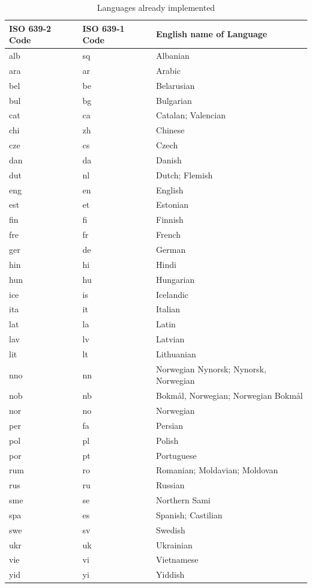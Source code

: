 \begin{table}[!htp]
    \caption{Languages already implemented}
    \label{tab:languagesImplemented}
    \begin{tabular}{L{3cm}|L{3cm}|L{6.5cm}}
      \textbf{ISO 639-2 Code} & \textbf{ISO 639-1 Code} & \textbf{English name of Language}\\
      \hline
alb & sq & Albanian\\
ara & ar & Arabic\\
bel & be & Belarusian\\
bul & bg & Bulgarian\\
cat & ca & Catalan; Valencian\\
chi & zh & Chinese\\
cze & cs & Czech\\
dan & da & Danish\\
dut & nl & Dutch; Flemish\\
eng & en & English\\
est & et & Estonian\\
fin & fi & Finnish\\
fre & fr & French\\
ger & de & German\\
hin & hi & Hindi\\
hun & hu & Hungarian\\
ice & is & Icelandic\\
ita & it & Italian\\
lat & la & Latin\\
lav & lv & Latvian\\
lit & lt & Lithuanian\\
nno & nn & Norwegian Nynorsk; Nynorsk, Norwegian\\
nob & nb & Bokmål, Norwegian; Norwegian Bokmål\\
nor & no & Norwegian\\
per & fa & Persian\\
pol & pl & Polish\\
por & pt & Portuguese\\
rum & ro & Romanian; Moldavian; Moldovan\\
rus & ru & Russian\\
sme & se & Northern Sami\\
spa & es & Spanish; Castilian\\
swe & sv & Swedish\\
ukr & uk & Ukrainian\\
vie & vi & Vietnamese\\
yid & yi & Yiddish\\
\hline
   \end{tabular}
\end{table}
\FloatBarrier

